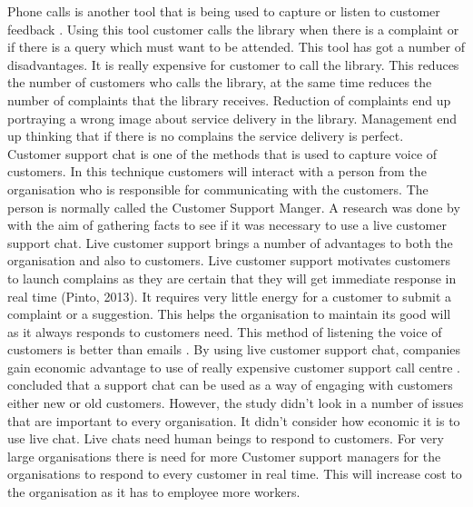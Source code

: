 \documentclass[12pt]{report}
\begin{document}
	Phone calls is another tool that is being used to capture or listen to customer feedback \citep{dean2007impact}. Using this tool customer calls the library when there is a complaint or if there is a query which must want to be attended. This tool has got a number of disadvantages. It is really expensive for customer to call the library. This reduces the number of customers who calls the library, at the same time reduces the number of complaints that the library receives. Reduction of complaints end up portraying a wrong image about service delivery in the library. Management end up thinking that if there is no complains the service delivery is perfect.\\
	
	Customer support chat is one of the methods that is used to capture voice of customers. In this technique customers will interact with a person from the organisation who is responsible for communicating with the customers. The person is normally called the Customer Support Manger. A research was done by \citep{torstensson2017customer} with the aim of gathering facts to see if it was necessary to use a live customer support chat. Live customer support brings a number of advantages to both the organisation and also to customers. Live customer support motivates customers to launch complains as they are certain that they will get immediate response in real time (Pinto, 2013). It requires very little energy for a customer to submit a complaint or a suggestion. This helps the organisation to maintain its good will as it always responds to customers need. This method of listening the voice of customers is better than emails \citep{elmorshidy2013applying}.  By using live customer support chat, companies gain economic advantage to use of really expensive customer support call centre \citep{elmorshidy2013applying}. \cite{torstensson2017customer} concluded that a support chat can be used as a way of engaging with customers either new or old customers. However, the study didn’t look in a number of issues that are important to every organisation. It didn’t consider how economic it is to use live chat. Live chats need human beings to respond to customers. For very large organisations there is need for more Customer support managers for the organisations to respond to every customer in real time. This will increase cost to the organisation as it has to employee more workers.\\
	
\end{document}
